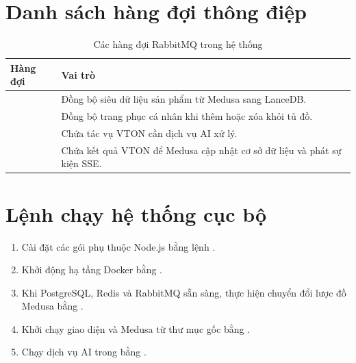 \section{Danh sách hàng đợi thông điệp}

\begin{table}[H]
\centering
\caption{Các hàng đợi RabbitMQ trong hệ thống}
\begin{tabularx}{\textwidth}{L{4cm}Y}
\toprule
\textbf{Hàng đợi} & \textbf{Vai trò} \\
\midrule
{} & Đồng bộ siêu dữ liệu sản phẩm từ Medusa sang LanceDB. \\
\addlinespace
{} & Đồng bộ trang phục cá nhân khi thêm hoặc xóa khỏi tủ đồ. \\
\addlinespace
{} & Chứa tác vụ VTON cần dịch vụ AI xử lý. \\
\addlinespace
{} & Chứa kết quả VTON để Medusa cập nhật cơ sở dữ liệu và phát sự kiện SSE. \\
\bottomrule
\end{tabularx}
\end{table}

\section{Lệnh chạy hệ thống cục bộ}

\begin{enumerate}
    \item Cài đặt các gói phụ thuộc Node.js bằng lệnh  .
    \item Khởi động hạ tầng Docker bằng    .
    \item Khi PostgreSQL, Redis và RabbitMQ sẵn sàng, thực hiện chuyển đổi lược đồ Medusa bằng      .
    \item Khởi chạy giao diện và Medusa từ thư mục gốc bằng  .
    \item Chạy dịch vụ AI trong  bằng     .
\end{enumerate}

\clearpage
